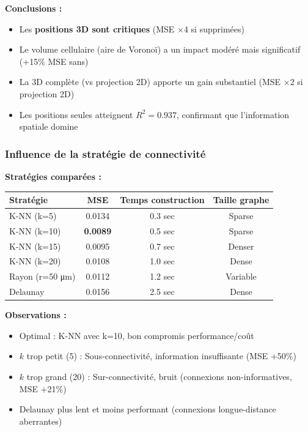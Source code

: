 \textbf{Conclusions :}
\begin{itemize}
    \item Les \textbf{positions 3D sont critiques} (MSE ×4 si supprimées)
    \item Le volume cellulaire (aire de Voronoï) a un impact modéré mais significatif (+15\% MSE sans)
    \item La 3D complète (vs projection 2D) apporte un gain substantiel (MSE ×2 si projection 2D)
    \item Les positions seules atteignent $R^2=0.937$, confirmant que l'information spatiale domine
\end{itemize}

\subsubsection{Influence de la stratégie de connectivité}

\textbf{Stratégies comparées :}

\begin{center}
\begin{tabular}{|l|c|c|c|}
\hline
\textbf{Stratégie} & \textbf{MSE} & \textbf{Temps construction} & \textbf{Taille graphe} \\
\hline
K-NN (k=5) & 0.0134 & 0.3 sec & Sparse \\
K-NN (k=10) & \textbf{0.0089} & 0.5 sec & Sparse \\
K-NN (k=15) & 0.0095 & 0.7 sec & Denser \\
K-NN (k=20) & 0.0108 & 1.0 sec & Dense \\
Rayon (r=50 μm) & 0.0112 & 1.2 sec & Variable \\
Delaunay & 0.0156 & 2.5 sec & Dense \\
\hline
\end{tabular}
\end{center}

\textbf{Observations :}
\begin{itemize}
    \item Optimal : K-NN avec k=10, bon compromis performance/coût
    \item $k$ trop petit (5) : Sous-connectivité, information insuffisante (MSE +50\%)
    \item $k$ trop grand (20) : Sur-connectivité, bruit (connexions non-informatives, MSE +21\%)
    \item Delaunay plus lent et moins performant (connexions longue-distance aberrantes)
\end{itemize}

